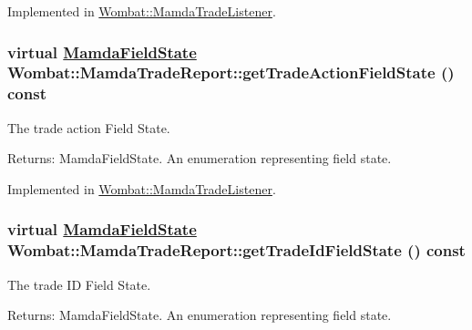 Implemented in \hyperlink{classWombat_1_1MamdaTradeListener_b0093f9dcf1bb03c17beb2915518a179}{Wombat::Mamda\-Trade\-Listener}.\hypertarget{classWombat_1_1MamdaTradeReport_c5344ba42657f2ba5a35c30240a384f1}{
\subsubsection[getTradeActionFieldState]{\setlength{\rightskip}{0pt plus 5cm}virtual \hyperlink{namespaceWombat_93aac974f2ab713554fd12a1fa3b7d2a}{Mamda\-Field\-State} Wombat::Mamda\-Trade\-Report::get\-Trade\-Action\-Field\-State () const}}
\label{classWombat_1_1MamdaTradeReport_c5344ba42657f2ba5a35c30240a384f1}


The trade action Field State. 

\begin{Desc}
\item[Returns:]Mamda\-Field\-State. An enumeration representing field state. \end{Desc}


Implemented in \hyperlink{classWombat_1_1MamdaTradeListener_bf9d994153ef2fa8b823517c2a061a28}{Wombat::Mamda\-Trade\-Listener}.\hypertarget{classWombat_1_1MamdaTradeReport_9ff0c7bf7e478588bb42718123fc62ca}{
\subsubsection[getTradeIdFieldState]{\setlength{\rightskip}{0pt plus 5cm}virtual \hyperlink{namespaceWombat_93aac974f2ab713554fd12a1fa3b7d2a}{Mamda\-Field\-State} Wombat::Mamda\-Trade\-Report::get\-Trade\-Id\-Field\-State () const}}
\label{classWombat_1_1MamdaTradeReport_9ff0c7bf7e478588bb42718123fc62ca}


The trade ID Field State. 

\begin{Desc}
\item[Returns:]Mamda\-Field\-State. An enumeration representing field state. \end{Desc}


